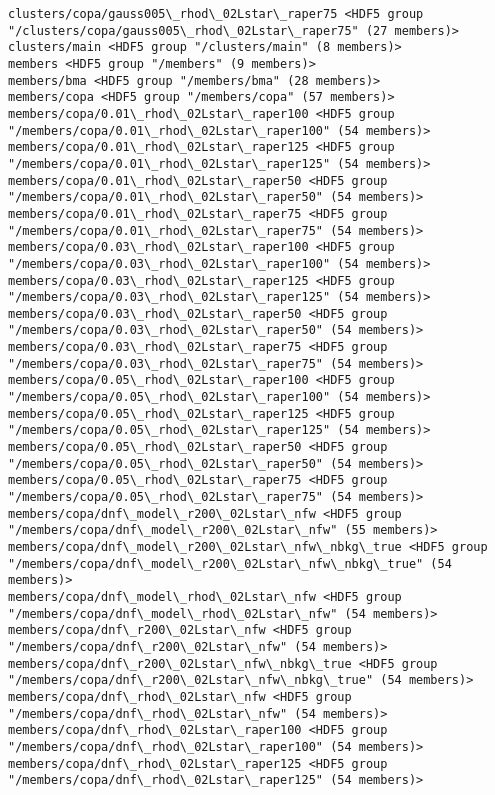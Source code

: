 \documentclass[11pt]{article}
\begin{document}
\begin{Verbatim}[commandchars=\\\{\}]
clusters/copa/gauss005\_rhod\_02Lstar\_raper75 <HDF5 group "/clusters/copa/gauss005\_rhod\_02Lstar\_raper75" (27 members)>
clusters/main <HDF5 group "/clusters/main" (8 members)>
members <HDF5 group "/members" (9 members)>
members/bma <HDF5 group "/members/bma" (28 members)>
members/copa <HDF5 group "/members/copa" (57 members)>
members/copa/0.01\_rhod\_02Lstar\_raper100 <HDF5 group "/members/copa/0.01\_rhod\_02Lstar\_raper100" (54 members)>
members/copa/0.01\_rhod\_02Lstar\_raper125 <HDF5 group "/members/copa/0.01\_rhod\_02Lstar\_raper125" (54 members)>
members/copa/0.01\_rhod\_02Lstar\_raper50 <HDF5 group "/members/copa/0.01\_rhod\_02Lstar\_raper50" (54 members)>
members/copa/0.01\_rhod\_02Lstar\_raper75 <HDF5 group "/members/copa/0.01\_rhod\_02Lstar\_raper75" (54 members)>
members/copa/0.03\_rhod\_02Lstar\_raper100 <HDF5 group "/members/copa/0.03\_rhod\_02Lstar\_raper100" (54 members)>
members/copa/0.03\_rhod\_02Lstar\_raper125 <HDF5 group "/members/copa/0.03\_rhod\_02Lstar\_raper125" (54 members)>
members/copa/0.03\_rhod\_02Lstar\_raper50 <HDF5 group "/members/copa/0.03\_rhod\_02Lstar\_raper50" (54 members)>
members/copa/0.03\_rhod\_02Lstar\_raper75 <HDF5 group "/members/copa/0.03\_rhod\_02Lstar\_raper75" (54 members)>
members/copa/0.05\_rhod\_02Lstar\_raper100 <HDF5 group "/members/copa/0.05\_rhod\_02Lstar\_raper100" (54 members)>
members/copa/0.05\_rhod\_02Lstar\_raper125 <HDF5 group "/members/copa/0.05\_rhod\_02Lstar\_raper125" (54 members)>
members/copa/0.05\_rhod\_02Lstar\_raper50 <HDF5 group "/members/copa/0.05\_rhod\_02Lstar\_raper50" (54 members)>
members/copa/0.05\_rhod\_02Lstar\_raper75 <HDF5 group "/members/copa/0.05\_rhod\_02Lstar\_raper75" (54 members)>
members/copa/dnf\_model\_r200\_02Lstar\_nfw <HDF5 group "/members/copa/dnf\_model\_r200\_02Lstar\_nfw" (55 members)>
members/copa/dnf\_model\_r200\_02Lstar\_nfw\_nbkg\_true <HDF5 group "/members/copa/dnf\_model\_r200\_02Lstar\_nfw\_nbkg\_true" (54 members)>
members/copa/dnf\_model\_rhod\_02Lstar\_nfw <HDF5 group "/members/copa/dnf\_model\_rhod\_02Lstar\_nfw" (54 members)>
members/copa/dnf\_r200\_02Lstar\_nfw <HDF5 group "/members/copa/dnf\_r200\_02Lstar\_nfw" (54 members)>
members/copa/dnf\_r200\_02Lstar\_nfw\_nbkg\_true <HDF5 group "/members/copa/dnf\_r200\_02Lstar\_nfw\_nbkg\_true" (54 members)>
members/copa/dnf\_rhod\_02Lstar\_nfw <HDF5 group "/members/copa/dnf\_rhod\_02Lstar\_nfw" (54 members)>
members/copa/dnf\_rhod\_02Lstar\_raper100 <HDF5 group "/members/copa/dnf\_rhod\_02Lstar\_raper100" (54 members)>
members/copa/dnf\_rhod\_02Lstar\_raper125 <HDF5 group "/members/copa/dnf\_rhod\_02Lstar\_raper125" (54 members)>

\end{Verbatim}
\end{document}
